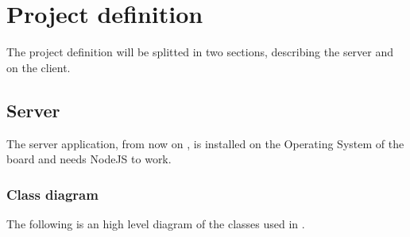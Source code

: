 \documentclass[../PiTest.tex]{subfiles}
\begin{document}
\section{Project definition}

    The project definition will be splitted in two sections, describing the server and on the client.

    \subsection{Server}
    The server application, from now on \pitest, is installed on the Operating System of the board and needs NodeJS to work.

    \subsubsection{Class diagram}
    The following is an high level diagram of the classes used in \pitest.
\end{document}
